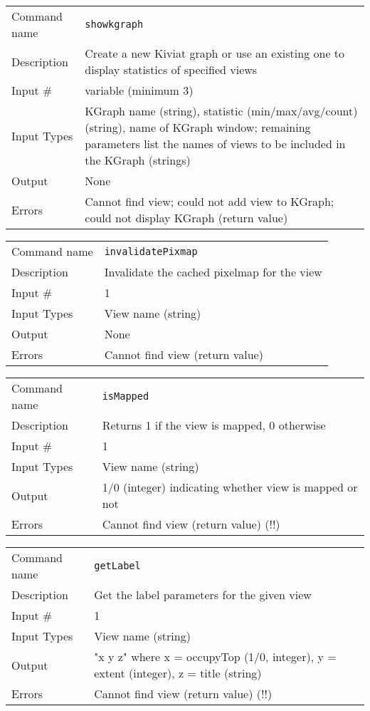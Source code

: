\bigskip

\noindent
\begin{tabular}{l|p{5in}}
\hline
Command name & {\tt showkgraph} \\
Description  & Create a new Kiviat graph or use an existing one to display
               statistics of specified views \\
Input \#     & variable (minimum 3) \\
Input Types  & KGraph name (string), statistic (min/max/avg/count) (string),
               name of KGraph window; remaining parameters list the names of
               views to be included in the KGraph (strings) \\
Output       & None \\
Errors       & Cannot find view; could not add view to KGraph; could not
               display KGraph (return value) \\
\hline
\end{tabular}

\bigskip

\noindent
\begin{tabular}{l|p{5in}}
\hline
Command name & {\tt invalidatePixmap} \\
Description  & Invalidate the cached pixelmap for the view \\
Input \#     & 1 \\
Input Types  & View name (string) \\
Output       & None \\
Errors       & Cannot find view (return value) \\
\hline
\end{tabular}

\bigskip

\noindent
\begin{tabular}{l|p{5in}}
\hline
Command name & {\tt isMapped} \\
Description  & Returns 1 if the view is mapped, 0 otherwise \\
Input \#     & 1 \\
Input Types  & View name (string) \\
Output       & 1/0 (integer) indicating whether view is mapped or not \\
Errors       & Cannot find view (return value) (!!) \\
\hline
\end{tabular}

\bigskip

\noindent
\begin{tabular}{l|p{5in}}
\hline
Command name & {\tt getLabel} \\
Description  & Get the label parameters for the given view \\
Input \#     & 1 \\
Input Types  & View name (string) \\
Output       & "x y z" where x = occupyTop (1/0, integer),
               y = extent (integer), z = title (string) \\
Errors       & Cannot find view (return value) (!!) \\
\hline
\end{tabular}

